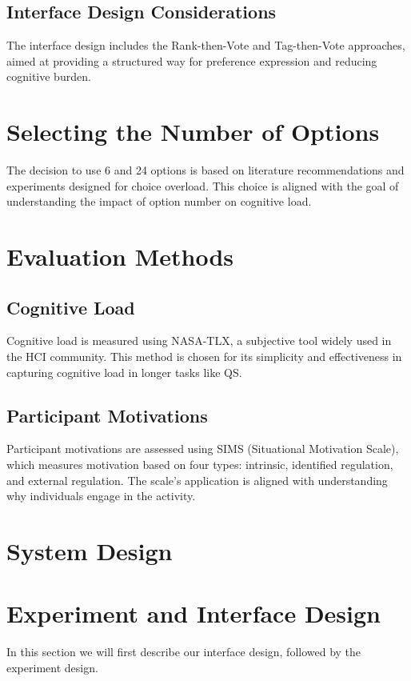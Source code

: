 \subsection{Interface Design Considerations}
The interface design includes the Rank-then-Vote and Tag-then-Vote approaches, aimed at providing a structured way for preference expression and reducing cognitive burden.

\section{Selecting the Number of Options}
The decision to use 6 and 24 options is based on literature recommendations and experiments designed for choice overload. This choice is aligned with the goal of understanding the impact of option number on cognitive load.

\section{Evaluation Methods}
\subsection{Cognitive Load}
Cognitive load is measured using NASA-TLX, a subjective tool widely used in the HCI community. This method is chosen for its simplicity and effectiveness in capturing cognitive load in longer tasks like QS.

\subsection{Participant Motivations}
Participant motivations are assessed using SIMS (Situational Motivation Scale), which measures motivation based on four types: intrinsic, identified regulation, and external regulation. The scale's application is aligned with understanding why individuals engage in the activity.


\section{System Design}



\section{Experiment and Interface Design}


In this section we will first describe our interface design, followed by the experiment design.
